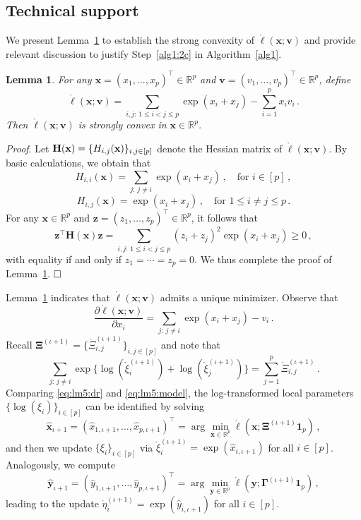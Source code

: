 \documentclass[12pt]{article}
\newtheorem{lemma}{Lemma}
\newcommand{\bXi}{\boldsymbol \Xi}
\def\T{{\scriptscriptstyle \top} }
\newcommand{\bx}{{\mathbf x}}
\newcommand{\by}{{\mathbf y}}
\newcommand{\bv}{{\mathbf v}}
\newcommand{\bz}{{\mathbf z}}
\newcommand{\bH}{{\bf H}}
\newcommand{\0}{{\bf 0}}
\begin{document}
\subsection{Technical support}
\label{supp:imom}

We present Lemma~\ref{convex} to establish the strong convexity of $\mathring \ell(\bx; \bv)$ and provide relevant discussion to justify Step~\ref{alg1:2c} in Algorithm~\ref{alg1}.

\begin{lemma} \label{convex}
    For any $\bx = (x_1, \dots, x_p)^\T \in \mathbb{R}^p$ and $\bv = (v_1, \dots, v_p)^\T \in \mathbb{R}^p$, define 
\[
\mathring \ell(\bx; \bv) = \sum_{i,j:\,1 \le i < j \le p} \exp(x_i + x_j) - \sum_{i=1}^p x_i v_i\,.
\]
Then $\mathring \ell(\bx; \bv)$ is strongly convex in $\bx \in \mathbb{R}^p$.
\end{lemma}
\noindent
\textit{{Proof}}. 
Let $\bH(\bx) = \{H_{i,j}(\bx)\}_{i,j \in [p]}$ denote the Hessian matrix of $\mathring \ell(\bx; \bv)$. By basic calculations, we obtain that
\[
H_{i,i}(\bx) = \sum_{j : \, j \ne i} \exp(x_i + x_j)\,, \quad \text{for~} i \in [p]\,,
\]
\[
H_{i,j}(\bx) = \exp(x_i + x_j)\,, \quad \text{for~} 1 \le i \ne j \le p\,.
\]
For any $\bx \in \mathbb{R}^p$ and $\bz = (z_1, \dots, z_p)^\T \in \mathbb{R}^p$, it follows that
\[
\mathbf{z}^\top \mathbf{H}(\bx) \mathbf{z} = \sum_{i,j:\,1 \le i < j \le p} (z_i + z_j)^2 \exp(x_i + x_j) \ge 0\,,
\]
with equality if and only if $z_1 = \cdots = z_p = 0$. We thus complete the
proof of Lemma~\ref{convex}. $\hfill\Box$


Lemma~\ref{convex} indicates that $\mathring \ell(\bx; \bv)$ admits a unique minimizer. Observe that 
\begin{equation}\label{eq:lm5:dr}
    \frac{\partial \mathring \ell(\bx; \bv)}{\partial x_i} = \sum_{j :\, j \ne i} \exp(x_i + x_j) - v_i\,.
\end{equation}
Recall $\bXi^{(\iota+1)} =  \{\mathring \Xi_{i,j}^{(\iota+1)}\}_{i,j \in [p]}$ and note that 
\begin{equation} \label{eq:lm5:model}
    \sum_{j :\, j \neq i} \exp\big\{\log(\mathring \xi_{i}^{(\iota+1)}) +\log(\mathring \xi_{j}^{(\iota+1)})\big\} = \sum_{j=1}^p \mathring \Xi_{i,j}^{(\iota+1)}\,.
\end{equation}
Comparing \eqref{eq:lm5:dr} and \eqref{eq:lm5:model}, the  log-transformed local parameters $\{\log(\xi_i)\}_{i \in [p]}$ can be identified by solving 
 $$\hat{\bx}_{\iota+1} = (\hat{x}_{1,\iota+1}, \dots, \hat{x}_{p,\iota+1})^\top = \arg\min_{\bx \in \mathbb{R}^p} \mathring \ell(\bx; \boldsymbol{\Xi}^{(\iota+1)} \mathbf{1}_p)\,,$$ and then we update $\{\xi_i\}_{i \in [p]}$ via $\mathring{\xi}_i^{(\iota+1)} = \exp(\hat{x}_{i,\iota+1})$ for all $i \in [p]$. Analogously, we compute $$\hat{\by}_{\iota+1} = (\hat{y}_{1,\iota+1}, \dots, \hat{y}_{p,\iota+1})^\top = \arg\min_{\by \in \mathbb{R}^p} \mathring \ell(\by; \boldsymbol{\Gamma}^{(\iota+1)} \mathbf{1}_p)\,,$$ leading to the update $\mathring{\eta}_i^{(\iota+1)} = \exp(\hat{y}_{i,\iota+1})$ for all $i \in [p]$.
 
\end{document}
